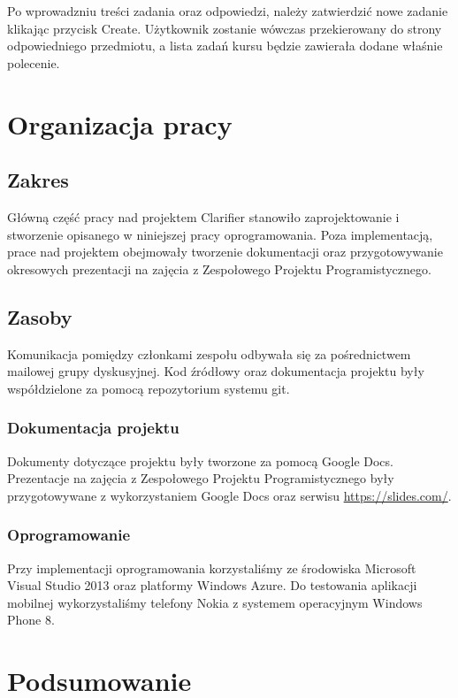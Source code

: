 \documentclass{pracamgr}
\begin{document}
Po wprowadzniu treści zadania oraz odpowiedzi, należy zatwierdzić nowe zadanie klikając przycisk Create. Użytkownik zostanie wówczas przekierowany do strony odpowiedniego przedmiotu, a lista zadań kursu będzie zawierała dodane właśnie polecenie.

\chapter{Organizacja pracy}\label{r:org}

\section{Zakres}
Główną część pracy nad projektem Clarifier stanowiło zaprojektowanie i stworzenie opisanego w niniejszej pracy oprogramowania. Poza implementacją, prace nad projektem obejmowały tworzenie dokumentacji oraz przygotowywanie okresowych prezentacji na zajęcia z Zespołowego Projektu Programistycznego. 

\section{Zasoby}
Komunikacja pomiędzy członkami zespołu odbywała się za pośrednictwem mailowej grupy dyskusyjnej. Kod źródłowy oraz dokumentacja projektu były współdzielone za pomocą repozytorium systemu git.

\subsection{Dokumentacja projektu}
Dokumenty dotyczące projektu były tworzone za pomocą Google Docs. Prezentacje na zajęcia z Zespołowego Projektu Programistycznego były przygotowywane z wykorzystaniem Google Docs oraz serwisu \url{https://slides.com/}.

\subsection{Oprogramowanie}
Przy implementacji oprogramowania korzystaliśmy ze środowiska Microsoft Visual Studio 2013 oraz platformy Windows Azure. Do testowania aplikacji mobilnej wykorzystaliśmy telefony Nokia z systemem operacyjnym Windows Phone 8.

\chapter{Podsumowanie}

\appendix
\end{document}
